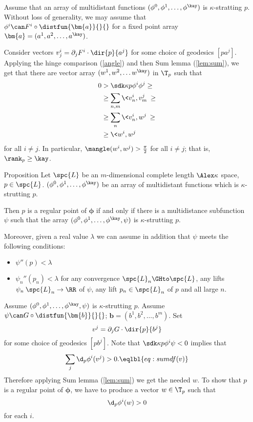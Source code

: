 Assume that 
an array of multidistant functions $(\phi^0,\phi^1,\dots,\phi^\kay)$ is $\kappa$-stratting $p$.
Without loss of generality, we may assume that 
$\phi^i\can F^i\circ\distfun{\bm{a}}{}{}$ for a fixed point array $\bm{a}=(a^1,a^2,\dots,a^\kay)$.

Consider vectors $v^i_j=\partial_jF^i\cdot\dir{p}{a^j}$ for some choice of geodesics $[pa^j]$.
Applying the hinge comparison (\ref{angle})
and then Sum lemma (\ref{lem:sum}), 
we get that there are vector array 
$(w^1,w^2,\dots w^\kay)$  in $\T_p$
such that 
\begin{align*}
0&>\sdk\kappa{p}{\phi^i}{\phi^j}
\ge
\\
&\ge\sum_{n,m}\<v^i_n,v^j_m\>\ge
\\
&\ge\sum_n\<v^i_n,w^j\>\ge
\\
&\ge\<w^i,w^j\>
\end{align*}
for all $i\ne j$.
In particular, $\mangle(w^i,w^j)>\tfrac\pi2$ for all $i\ne j$;
that is, $\rank_p\ge \kay$.
\qeds



\begin{thm}{Proposition}\label{prop:regular=+1}
Let $\spc{L}$ be an $m$-dimensional complete length $\Alex\kappa$ space, 
$p\in  \spc{L}$.
$(\phi^0,\phi^1,\dots,\phi^\kay)$
be an array of multidistant functions which is $\kappa$-strutting $p$.

Then $p$ is a regular point of $\bm{\phi}$ if and only if there is a multidistance subfunction $\psi$ such that 
the array 
$(\phi^0,\phi^1,\dots,\phi^\kay,\psi)$ 
is $\kappa$-strutting $p$.

Moreover, given a real value $\lambda$
we can assume in addition that $\psi$ meets the following conditions:
\begin{itemize}
\item $\psi''(p)< \lambda$
\item $\psi_n''(p_n)< \lambda$ for 
any convergence $\spc{L}_n\GHto\spc{L}$,
any lifts $\psi_n\:\spc{L}_n\to\RR$ of $\psi$,
any lift $p_n\in \spc{L}_n$ of $p$
and all large $n$.
\end{itemize}
\end{thm}



Assume $(\phi^0,\phi^1,\dots,\phi^\kay,\psi)$ is $\kappa$-strutting $p$.
Assume $\psi\can G\circ\distfun{\bm{b}}{}{}$;
$\bm{b}=(b^1,b^2,\dots,b^m)$.
Set 
\[v^j=\partial_jG\cdot \dir{p}{b^j}\] 
for some choice of geodesics $[p b^j]$.
Note that $\sdk\kappa p{\phi^i}\psi<0$ implies that
\[\sum_j\d_p\phi^i(v^j)>0.
\eqlbl{eq:sum df(v)}
\]
Therefore applying Sum lemma (\ref{lem:sum})
we get the needed $w$.
 To show that $p$ is a regular point of $\bm{\phi}$,
we have to produce a vector $w\in\T_p$ such that 
\[\d_p\phi^i(w)>0\] 
for each $i$.

